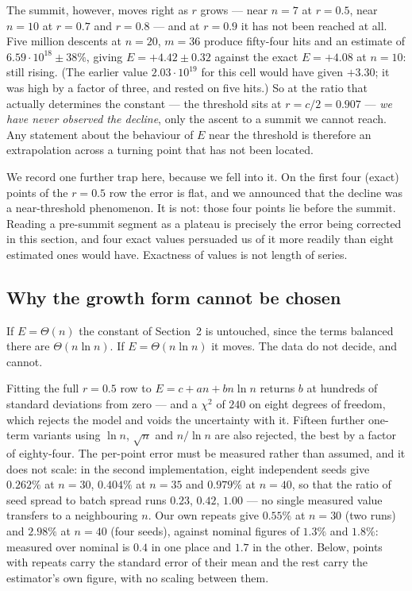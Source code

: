 \documentclass[11pt,a4paper]{article}
\begin{document}
The summit, however, moves right as $r$ grows --- near $n=7$ at $r=0.5$, near $n=10$ at $r=0.7$
and $r=0.8$ --- and at $r=0.9$ it has not been reached at all.  Five million descents at
$n=20$, $m=36$ produce fifty-four hits and an estimate of $6.59\cdot10^{18}\pm38\%$, giving
$E=+4.42\pm0.32$ against the exact $E=+4.08$ at $n=10$: still rising.  (The earlier value
$2.03\cdot10^{19}$ for this cell would have given $+3.30$; it was high by a factor of three, and
rested on five hits.)  So at the ratio that actually determines the constant --- the threshold
sits at $r=c/2=0.907$ --- \emph{we have never observed the decline}, only the ascent to a summit
we cannot reach.  Any statement about the behaviour of $E$ near the threshold is therefore an
extrapolation across a turning point that has not been located.

We record one further trap here, because we fell into it.  On the first four (exact) points of
the $r=0.5$ row the error is flat, and we announced that the decline was a near-threshold
phenomenon.  It is not: those four points lie before the summit.  Reading a pre-summit segment
as a plateau is precisely the error being corrected in this section, and four exact values
persuaded us of it more readily than eight estimated ones would have.  Exactness of values is
not length of series.

\subsection*{Why the growth form cannot be chosen}
If $E=\Theta(n)$ the constant of Section~2 is untouched, since the terms balanced there are
$\Theta(n\ln n)$.  If $E=\Theta(n\ln n)$ it moves.  The data do not decide, and cannot.

Fitting the full $r=0.5$ row to $E=c+an+bn\ln n$ returns $b$ at hundreds of standard deviations
from zero --- and a $\chi^2$ of $240$ on eight degrees of freedom, which rejects the model and
voids the uncertainty with it.  Fifteen further one-term variants using $\ln n$, $\sqrt n$ and
$n/\ln n$ are also rejected, the best by a factor of eighty-four.  The per-point error must be measured rather than assumed, and it does not scale: in the second
implementation, eight independent seeds give $0.262\%$ at $n=30$, $0.404\%$ at $n=35$ and
$0.979\%$ at $n=40$, so that the ratio of seed spread to batch spread runs $0.23$, $0.42$, $1.00$
--- no single measured value transfers to a neighbouring $n$.  Our own repeats give $0.55\%$ at
$n=30$ (two runs) and $2.98\%$ at $n=40$ (four seeds), against nominal figures of $1.3\%$ and
$1.8\%$: measured over nominal is $0.4$ in one place and $1.7$ in the other.  Below, points with
repeats carry the standard error of their mean and the rest carry the estimator's own figure,
with no scaling between them.
\end{document}
